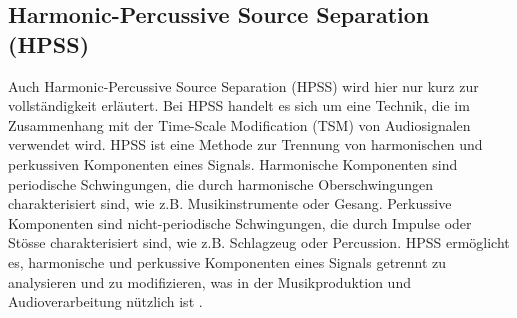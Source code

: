 \subsection{Harmonic-Percussive Source Separation (HPSS)}
Auch Harmonic-Percussive Source Separation (HPSS) wird hier nur kurz zur vollständigkeit erläutert. Bei HPSS handelt es sich um  eine Technik, die im Zusammenhang mit der Time-Scale Modification (TSM) von Audiosignalen verwendet wird. HPSS ist eine Methode zur Trennung von harmonischen und perkussiven Komponenten eines Signals. Harmonische Komponenten sind periodische Schwingungen, die durch harmonische Oberschwingungen charakterisiert sind, wie z.B. Musikinstrumente oder Gesang. Perkussive Komponenten sind nicht-periodische Schwingungen, die durch Impulse oder Stösse charakterisiert sind, wie z.B. Schlagzeug oder Percussion. HPSS ermöglicht es, harmonische und perkussive Komponenten eines Signals getrennt zu analysieren und zu modifizieren, was in der Musikproduktion und Audioverarbeitung nützlich ist \cite{Driedger2016ARO}.